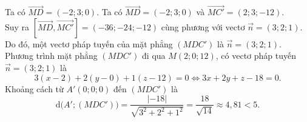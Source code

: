 \begin{ex}
{\begin{itemchoice}
			Ta có $\overrightarrow{MD}=(-2;3;0)$.
			\itemch Ta có $\overrightarrow{MD} = (-2;3;0)$ và $\overrightarrow{MC'}=(2;3;-12)$.\\
			Suy ra $\left[\overrightarrow{MD}, \overrightarrow{MC'}\right] =(-36; -24; -12)$ cùng phương với vectơ $\overrightarrow{n}= (3;2;1)$.\\
			Do đó, một vectơ pháp tuyến của mặt phẳng $\left(MDC'\right)$ là $\overrightarrow{n}= (3;2;1)$.
			\itemch Phương trình mặt phẳng $\left(MDC'\right)$ đi qua $M(2;0;12)$, có vectơ pháp tuyến $\overrightarrow{n}=(3;2;1)$ là
			\[3(x-2) + 2(y-0) + 1(z-12) = 0 \Leftrightarrow 3x + 2y + z - 18 = 0.\]
			Khoảng cách từ $A'(0;0;0)$ đến $\left(MDC'\right)$ là
			\[\mathrm{d}\big(A';\left(MDC'\right)\big)=\dfrac{|-18|}{\sqrt{3^2 + 2^2 + 1^2}} = \dfrac{18}{\sqrt{14}} \approx 4{,}81 < 5.\]
		\end{itemchoice}
	}
\end{ex}

